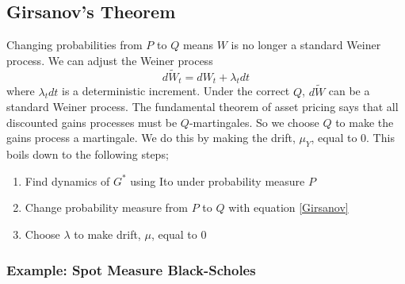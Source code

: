 \documentclass[12pt]{article}
\begin{document}
\subsection{Girsanov's Theorem}

Changing probabilities from $P$ to $Q$ means $W$ is no longer a standard Weiner
process. We can adjust the Weiner process
\begin{equation} \label{Girsanov}
d\tilde{W}_t=dW_t+\lambda_tdt
\end{equation}
where $\lambda_tdt$ is a deterministic increment. Under the correct $Q$,
$d\tilde{W}$ can be a standard Weiner process.
The fundamental theorem of asset pricing says that all discounted gains
processes must be $Q$-martingales. So we choose $Q$ to make the gains process
a martingale. We do this by making the drift, $\mu_Y$, equal to $0$. This boils
down to the following steps;
\begin{enumerate}
  \item Find dynamics of $G^*$ using Ito under probability measure $P$
  \item Change probability measure from $P$ to $Q$ with equation \ref{Girsanov}
  \item Choose $\lambda$ to make drift, $\mu$, equal to $0$
\end{enumerate}

\subsubsection{Example: Spot Measure Black-Scholes}
\end{document}
